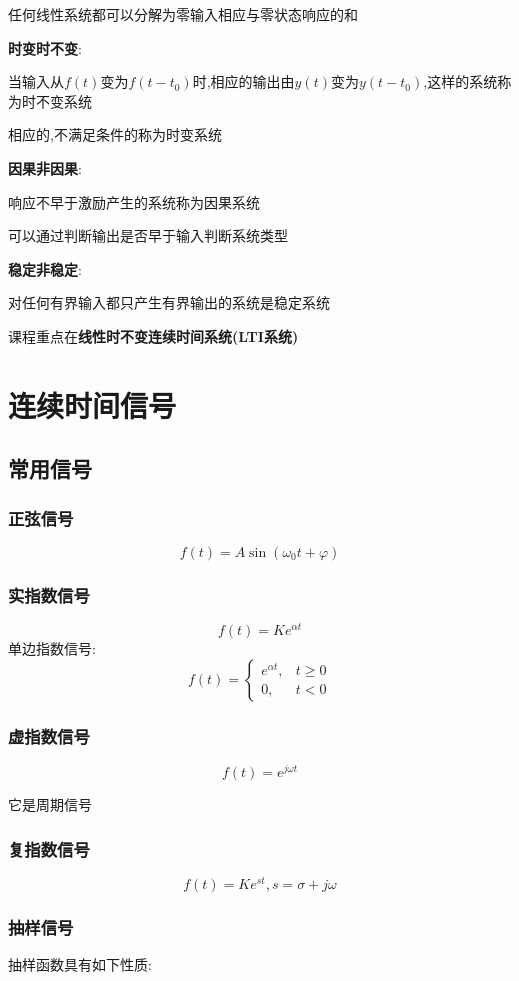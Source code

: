 \documentclass[12pt, a4paper, oneside]{ctexart}
\begin{document}
任何线性系统都可以分解为零输入相应与零状态响应的和

\textbf{时变时不变}:

当输入从$f(t)$变为$f(t-t_0)$时,相应的输出由$y(t)$变为$y(t-t_0)$,这样的系统称为时不变系统

相应的,不满足条件的称为时变系统

\textbf{因果非因果}:

响应不早于激励产生的系统称为因果系统

可以通过判断输出是否早于输入判断系统类型

\textbf{稳定非稳定}:

对任何有界输入都只产生有界输出的系统是稳定系统

课程重点在\textbf{线性时不变连续时间系统(LTI系统)}

\section{连续时间信号}
\subsection{常用信号}
\subsubsection{正弦信号}
\[f(t)=A\sin (\omega_0t+\varphi)\]

\subsubsection{实指数信号}
\[f(t)=Ke^{\alpha t}\]
单边指数信号:
\[
    f(t)=\begin{cases}
        e^{\alpha t},&t \ge 0\\
        0,&t < 0
    \end{cases}
\]

\subsubsection{虚指数信号}
\[f(t)=e^{j\omega t}\]

它是周期信号

\subsubsection{复指数信号}
\[f(t)=Ke^{st},s=\sigma +j\omega \]

\subsubsection{抽样信号}
抽样函数具有如下性质:
\end{document}
